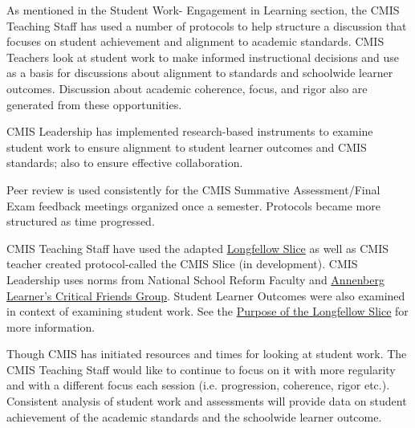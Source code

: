 
\begin{findings}
As mentioned in the Student Work- Engagement in Learning section, the CMIS Teaching Staff has used a number of protocols to help structure a discussion that focuses on student achievement and alignment to academic standards. CMIS Teachers look at student work to make informed instructional decisions and use as a basis for discussions about alignment to standards and schoolwide learner outcomes. Discussion about academic coherence, focus, and rigor also are generated from these opportunities. 

CMIS Leadership has implemented research-based instruments to examine student work to ensure  alignment to student learner outcomes and CMIS standards; also to ensure effective collaboration. 


Peer review is used consistently for the CMIS Summative Assessment/Final Exam feedback meetings organized once a semester. Protocols became more structured as time progressed.


CMIS Teaching Staff have used the adapted \href{https://docs.google.com/a/cmis.ac.th/document/d/1aobA3IksQDoGJ-JKci0YDfFDCgT2ugHM7r_T4i_CL7o/edit?usp=sharing}{Longfellow Slice} as well as CMIS teacher created protocol-called the CMIS Slice (in development). CMIS Leadership uses norms from National School Reform Faculty and \href{https://drive.google.com/a/cmis.ac.th/file/d/0ByVFfrm0zfoleTBsYnhNUFZHbVE/view?usp=sharing}{Annenberg Learner’s Critical Friends Group}. Student Learner Outcomes were also examined in context of examining student work. See the \href{https://docs.google.com/a/cmis.ac.th/document/d/1En9qeldzNSJDHs7m_jRRqNUx6v1EMKD_5MRH0GJsFQM/edit?usp=sharing}{Purpose of the Longfellow Slice} for more information. 


Though CMIS has initiated resources and times for looking at student work. The CMIS Teaching Staff would like to continue to focus on it with more regularity and with a different focus each session  (i.e. progression, coherence, rigor etc.). Consistent analysis of student work and assessments will provide data on  student achievement of the academic standards and the schoolwide learner outcome.
\end{findings}

